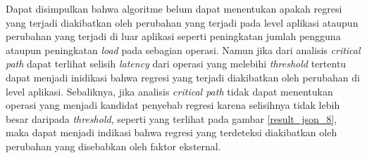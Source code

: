 Dapat disimpulkan bahwa algoritme belum dapat menentukan apakah regresi yang terjadi diakibatkan oleh perubahan yang terjadi pada level aplikasi ataupun perubahan yang terjadi di luar aplikasi seperti peningkatan jumlah pengguna ataupun peningkatan \textit{load} pada sebagian operasi. Namun jika dari analisis \textit{critical path} dapat terlihat selisih \textit{latency} dari operasi yang melebihi \textit{threshold} tertentu dapat menjadi inidikasi bahwa regresi yang terjadi diakibatkan oleh perubahan di level aplikasi. Sebaliknya, jika analisis \textit{critical path} tidak dapat menentukan operasi yang menjadi kandidat penyebab regresi karena selisihnya tidak lebih besar daripada \textit{threshold}, seperti yang terlihat pada gambar \ref{result_json_8}, maka dapat menjadi indikasi bahwa regresi yang terdeteksi diakibatkan oleh perubahan yang disebabkan oleh faktor eksternal.
